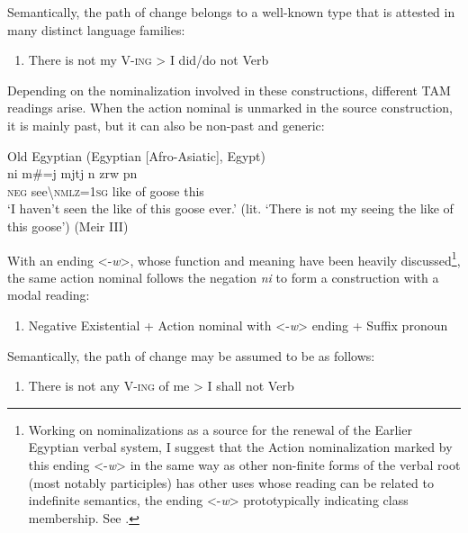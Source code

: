 \documentclass[output=paper]{langsci/langscibook}
\begin{document}
Semantically, the path of change belongs to a well-known type that is attested in many distinct language families: 

\begin{enumerate}[label=(\roman*), resume] %
	\item There is not my V-\textsc{ing} > I did/do not Verb \\
\end{enumerate}

Depending on the nominalization involved in these constructions, different TAM readings arise. When the action nominal is unmarked in the source construction, it is mainly past, but it can also be non-past and generic: 

\ea Old Egyptian (Egyptian [Afro-Asiatic], Egypt) \label{ex:AE6}\\
	\gll ni m\#=j mjtj n zrw pn\\
	\textsc{neg} see\textbackslash\textsc{nmlz=1sg} like of goose this\\
	\glt ‘I haven’t seen the like of this goose ever.’ (lit. ‘There is not my seeing the like of this goose’) (Meir III)
\z 

With an ending <-\textit{w}>, whose function and meaning have been heavily discussed\footnote{Working on nominalizations as a source for the renewal of the Earlier Egyptian verbal system, I suggest that the Action nominalization marked by this ending <-\textit{w}> in the same way as other non-finite forms of the verbal root (most notably participles) has other uses whose reading can be related to indefinite semantics, the ending <-\textit{w}> prototypically indicating class membership. See \citet{Oreal2017}.}, the same action nominal follows the negation \textit{ni} to form a construction with a modal reading:

\begin{enumerate}[label=(\roman*), resume] %
	\item Negative Existential + Action nominal with <-\textit{w}> ending + Suffix pronoun\\
\end{enumerate}

Semantically, the path of change may be assumed to be as follows: 

\begin{enumerate}[label=(\roman*), resume] %
	\item There is not any V-\textsc{ing} of me > I shall not Verb\\
\end{enumerate}
\end{document}
